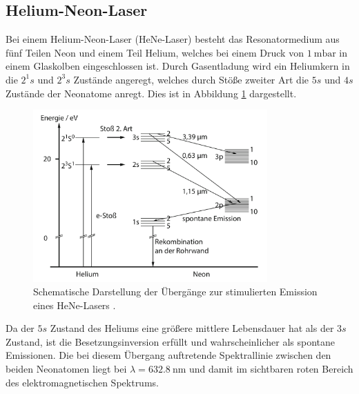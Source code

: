 \subsection{Helium-Neon-Laser}
\label{sec:Helium-Neon-Laser}
Bei einem Helium-Neon-Laser (HeNe-Laser)
besteht das Resonatormedium aus fünf Teilen Neon und einem Teil Helium, welches
bei einem Druck von $\SI{1}{\milli\bar}$ in einem Glaskolben eingeschlossen ist.
Durch Gasentladung wird ein Heliumkern in die $2^1s$ und $2^3s$ Zustände angeregt,
welches durch Stöße zweiter Art die $5s$ und $4s$ Zustände der Neonatome anregt.
Dies ist in Abbildung \ref{fig:HeNe} dargestellt.
\begin{figure}
  \centering
  \includegraphics[width=0.8\textwidth]{content/HeNe.pdf}
  \caption{Schematische Darstellung der Übergänge zur stimulierten
  Emission eines HeNe-Lasers \cite[68]{eichler}.}
  \label{fig:HeNe}
\end{figure}

Da der $5s$ Zustand des Heliums eine größere mittlere Lebensdauer hat als der $3s$ Zustand,
ist die Besetzungsinversion erfüllt und wahrscheinlicher als spontane Emissionen.
Die bei diesem Übergang auftretende Spektrallinie zwischen den beiden Neonatomen liegt bei
$\lambda = \SI{632.8}{\nano\metre}$ und damit im sichtbaren roten Bereich des elektromagnetischen
Spektrums.

